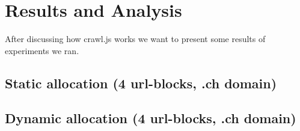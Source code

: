 
\chapter{Results and Analysis} %

\label{Chapter5} %


After discussing how crawl.js works we want to present some results of experiments we ran.

\section{Static allocation (4 url-blocks, .ch domain)}
\section{Dynamic allocation (4 url-blocks, .ch domain)}


